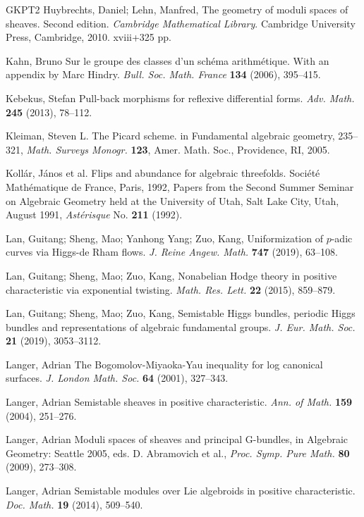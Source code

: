 \documentclass[12pt]{article}
\theoremstyle{plain}
\theoremstyle{definition}
\theoremstyle{remark}
\begin{document}
\begin{thebibliography}{GKPT2}
  Huybrechts, Daniel; Lehn, Manfred, The geometry of moduli spaces of sheaves. Second edition. 
\emph{Cambridge Mathematical Library}. Cambridge University Press, Cambridge, 2010. xviii+325 pp.

 Kahn, Bruno  Sur le groupe des classes d'un sch\'ema arithm\'etique. 
With an appendix by Marc Hindry. \emph{Bull. Soc. Math. France} {\bf 134} (2006), 395--415. 

 Kebekus, Stefan Pull-back morphisms for reflexive differential forms. \emph{Adv. Math.} {\bf 245} (2013), 78--112.

 Kleiman, Steven L. The Picard scheme. in {Fundamental algebraic geometry}, 235--321,
\emph{Math. Surveys Monogr.} {\bf 123}, Amer. Math. Soc., Providence, RI, 2005. 

 Koll\'ar, J\'anos et al. Flips and abundance for algebraic threefolds. Soci\'et\'e Math\'ematique de France, Paris, 1992, Papers from the Second Summer Seminar on Algebraic Geometry
held at the University of Utah, Salt Lake City, Utah, August 1991, \emph{Ast\'erisque} No. {\bf 211}
(1992).

 Lan, Guitang; Sheng, Mao; Yanhong Yang; Zuo,
Kang, Uniformization of $p$-adic curves via Higgs-de Rham flows.
\emph{J. Reine Angew. Math.} {\bf 747} (2019), 63--108.

 Lan, Guitang; Sheng, Mao; Zuo, Kang, Nonabelian
  Hodge theory in positive characteristic via exponential
  twisting. \emph{Math. Res. Lett.} {\bf 22} (2015), 859--879.

 Lan, Guitang; Sheng, Mao; Zuo, Kang, Semistable
  Higgs bundles, periodic Higgs bundles and representations of
  algebraic fundamental groups.   \emph{J. Eur. Math. Soc.} {\bf 21} (2019), 3053--3112.


 Langer, Adrian The Bogomolov-Miyaoka-Yau inequality for log canonical surfaces.
\emph{J. London Math. Soc.} {\bf 64} (2001), 327--343.

 Langer, Adrian Semistable sheaves in positive characteristic.
\emph{Ann. of Math.} {\bf 159} (2004), 251--276.

 Langer, Adrian Moduli spaces of sheaves and principal G-bundles, in Algebraic Geometry: Seattle 2005, eds. D. Abramovich et al., \emph{Proc. Symp. Pure Math.} {\bf 80} (2009), 273--308.

 Langer, Adrian Semistable modules over Lie
  algebroids in positive characteristic. \emph{Doc. Math.} {\bf 19}
  (2014), 509--540.



\end{thebibliography}
\end{document}
